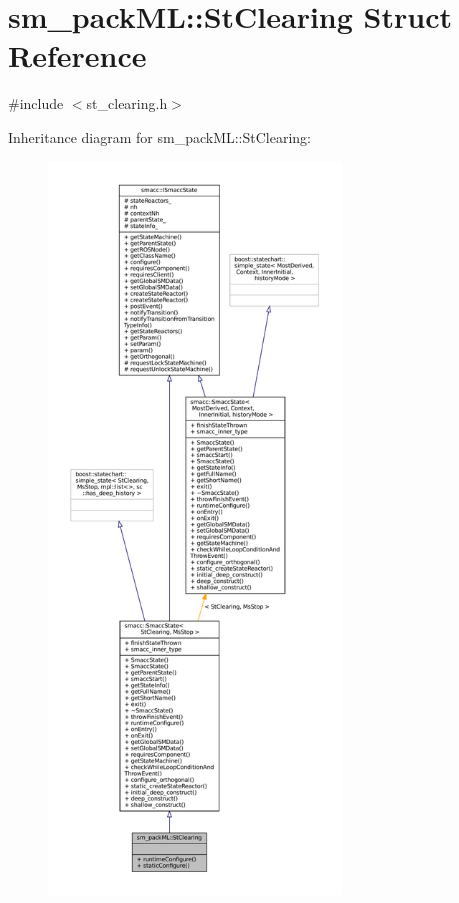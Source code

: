 \hypertarget{structsm__packML_1_1StClearing}{}\section{sm\+\_\+pack\+ML\+:\+:St\+Clearing Struct Reference}
\label{structsm__packML_1_1StClearing}


{\ttfamily \#include $<$st\+\_\+clearing.\+h$>$}



Inheritance diagram for sm\+\_\+pack\+ML\+:\+:St\+Clearing\+:
\nopagebreak
\begin{figure}[H]
\begin{center}
\leavevmode
\includegraphics[height=550pt]{structsm__packML_1_1StClearing__inherit__graph}
\end{center}
\end{figure}


